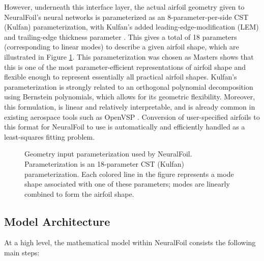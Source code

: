 \documentclass[conf]{new-aiaa}
\begin{document}
    However, underneath this interface layer, the actual airfoil geometry given to NeuralFoil's neural networks is parameterized as an 8-parameter-per-side CST (Kulfan) parameterization, with Kulfan's added leading-edge-modification (LEM) and trailing-edge thickness parameter \cite{kulfan_universal_2008, kulfan_modification_2020}. This gives a total of 18 parameters (corresponding to linear modes) to describe a given airfoil shape, which are illustrated in Figure \ref{fig:neuralfoil_parameterization}. This parameterization was chosen as Masters \cite{masters_geometric_2017} shows that this is one of the most parameter-efficient representations of airfoil shape and flexible enough to represent essentially all practical airfoil shapes. Kulfan's parameterization is strongly related to an orthogonal polynomial decomposition using Bernstein polynomials, which allows for its geometric flexibility. Moreover, this formulation, is linear and relatively interpretable, and is already common in existing aerospace tools such as OpenVSP \cite{mcdonald_open_2022}. Conversion of user-specified airfoils to this format for NeuralFoil to use is automatically and efficiently handled as a least-squares fitting problem.

    \begin{figure}[h]
        \centering
        \caption{Geometry input parameterization used by NeuralFoil. Parameterization is an 18-parameter CST (Kulfan) parameterization. Each colored line in the figure represents a mode shape associated with one of these parameters; modes are linearly combined to form the airfoil shape.}
        \label{fig:neuralfoil_parameterization}
    \end{figure}

    \subsection{Model Architecture}

    At a high level, the mathematical model within NeuralFoil consists the following main steps:
\end{document}
